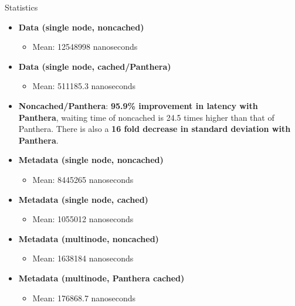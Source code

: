 \documentclass[final]{beamer} %
\begin{document}
\begin{frame}
\begin{columns}[t]
\begin{column}{0.32\textwidth}
    \begin{block}{Statistics}
    \begin{itemize}
    		\item \textbf{Data (single node, noncached)}
    		\begin{itemize}
    			\item Mean: 12548998 nanoseconds
    		\end{itemize}
    		\item \textbf{Data (single node, cached/Panthera)}
    		\begin{itemize}
    			\item Mean: 511185.3 nanoseconds
    		\end{itemize}
    		\item \textbf{Noncached/Panthera}: \textbf{95.9\% improvement in latency with Panthera}, waiting time of noncached is 24.5 times higher than that of Panthera. There is also a \textbf{16 fold decrease in standard deviation with Panthera}.
    		
    		\item \textbf{Metadata (single node, noncached)}
    		\begin{itemize}
    			\item Mean: 8445265 nanoseconds
    		\end{itemize}
    		
    		\item \textbf{Metadata (single node, cached)}
    		\begin{itemize}
    			\item Mean: 1055012 nanoseconds
    		\end{itemize}
    		
    		\item \textbf{Metadata (multinode, noncached)}
		\begin{itemize}
			\item Mean: 1638184 nanoseconds    		
    		\end{itemize}
    		
    		\item \textbf{Metadata (multinode, Panthera cached)}
    		\begin{itemize}
			\item Mean: 176868.7 nanoseconds    		
    		\end{itemize}
    		

\end{itemize}
\end{block}
\end{column}
\end{columns}
\end{frame}
\end{document}
